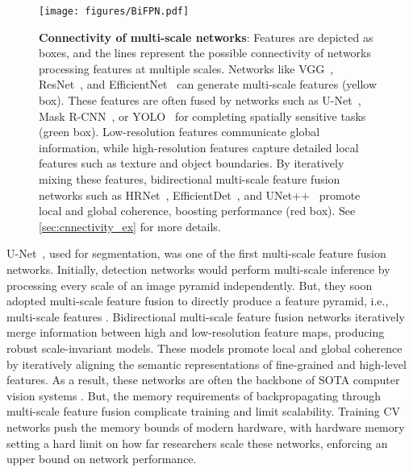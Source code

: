 \documentclass{article}
\begin{document}
\begin{figure*}
    \centering
    \texttt{[image: figures/BiFPN.pdf]}
    \vskip -2pt
    \caption{
    \textbf{Connectivity of multi-scale networks}:
    Features are depicted as boxes, and the lines represent the possible connectivity of networks processing features at multiple scales.
    Networks like VGG~\cite{simonyan2014very}, ResNet~\cite{he2016deep}, and EfficientNet~\cite{tan2019efficientnet} can generate multi-scale features (yellow box).
    These features are often fused by networks such as U-Net~\cite{ronneberger2015unet}, Mask R-CNN~\cite{he2017mask}, or YOLO~\cite{redmon2018yolov3} for completing spatially sensitive tasks (green box). 
    Low-resolution features communicate global information, while high-resolution features capture detailed local features such as texture and object boundaries.
    By iteratively mixing these features, bidirectional multi-scale feature fusion networks such as HRNet~\cite{sun2019hrnet_pose}, EfficientDet~\cite{tan2020efficientdet}, and UNet++~\cite{zhou2018unet} promote local and global coherence, boosting performance (red box). See \cref{sec:cnnectivity_ex} for more details.}
    \label{fig:bifpn}
    \vskip -10pt
\end{figure*}

U-Net~\cite{ronneberger2015unet}, used for segmentation, was one of the first multi-scale feature fusion networks.
Initially, detection networks would perform multi-scale inference by processing every scale of an image pyramid independently. But, they soon adopted multi-scale feature fusion to directly produce a feature pyramid, i.e., multi-scale features \cite{lin2017feature, lin2017focal, redmon2018yolov3}.
Bidirectional multi-scale feature fusion networks iteratively merge information between high and low-resolution feature maps, producing robust \cite{hendrycks2019benchmarking} scale-invariant models.
These models promote local and global coherence by iteratively aligning the semantic representations of fine-grained and high-level features.
As a result, these networks are often the backbone of SOTA computer vision systems \cite{liu2018path, cai2018cascade, sun2019hrnet_pose, tan2020efficientdet}. But, the memory requirements of backpropagating through multi-scale feature fusion complicate training and limit scalability.
Training CV networks push the memory bounds of modern hardware, with hardware memory setting a hard limit on how far researchers scale these networks, enforcing an upper bound on network performance.
\end{document}
